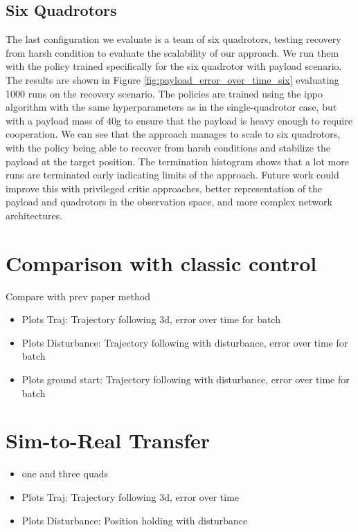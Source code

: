 \subsection{Six Quadrotors}
The last configuration we evaluate is a team of six quadrotors, testing recovery from harsh condition to evaluate the scalability of our approach. We run them with the policy trained specifically for the six quadrotor with payload scenario. The results are shown in Figure \ref{fig:payload_error_over_time_six} evaluating 1000 runs on the recovery scenario. 
The policies are trained using the \gls{ippo} algorithm with the same hyperparameters as in the single-quadrotor case, but with a payload mass of 40g to ensure that the payload is heavy enough to require cooperation.
We can see that the approach manages to scale to six quadrotors, with the policy being able to recover from harsh conditions and stabilize the payload at the target position. The termination histogram shows that  a lot more runs are terminated early indicating limits of the approach. Future work could improve this with privileged critic approaches, better representation of the payload and quadrotors in the observation space, and more complex network architectures.

\section{Comparison with classic control}
Compare with prev paper method \autocite{Wahba2024}
\begin{itemize}
    \item Plots Traj: Trajectory following 3d, error over time for batch
    \item Plots Disturbance: Trajectory following with disturbance, error over time for batch
    \item Plots ground start: Trajectory following with disturbance, error over time for batch
\end{itemize} 
\section{Sim-to-Real Transfer}
\begin{itemize}
    \item one and three quads
    \item Plots Traj: Trajectory following 3d,  error over time 
    \item Plots Disturbance: Position holding with disturbance
\end{itemize}

